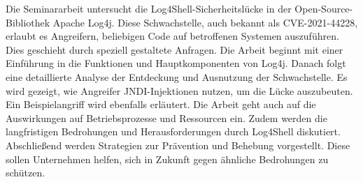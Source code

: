 \begin{center} 
    \huge {}
\end{center}


Die Seminararbeit untersucht die Log4Shell-Sicherheitslücke in der Open-Source-Bibliothek Apache Log4j. Diese Schwachstelle, auch bekannt als CVE-2021-44228, erlaubt es Angreifern, beliebigen Code auf betroffenen Systemen auszuführen. Dies geschieht durch speziell gestaltete Anfragen. Die Arbeit beginnt mit einer Einführung in die Funktionen und Hauptkomponenten von Log4j. Danach folgt eine detaillierte Analyse der Entdeckung und Ausnutzung der Schwachstelle. Es wird gezeigt, wie Angreifer JNDI-Injektionen nutzen, um die Lücke auszubeuten. Ein Beispielangriff wird ebenfalls erläutert. Die Arbeit geht auch auf die Auswirkungen auf Betriebsprozesse und Ressourcen ein. Zudem werden die langfristigen Bedrohungen und Herausforderungen durch Log4Shell diskutiert. Abschließend werden Strategien zur Prävention und Behebung vorgestellt. Diese sollen Unternehmen helfen, sich in Zukunft gegen ähnliche Bedrohungen zu schützen.